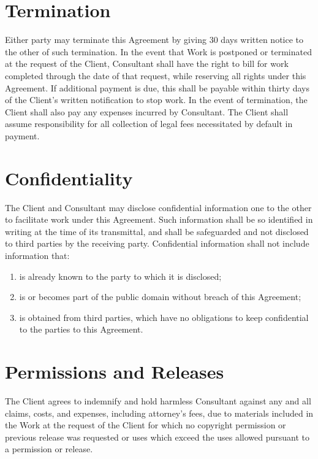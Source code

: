 \documentclass[10pt]{article}
\begin{document}
	
	\section{Termination}
	
	Either party may terminate this Agreement by giving 30 days written notice
	to the other of such termination. In the event that Work is postponed or
	terminated at the request of the Client, Consultant shall have the right to
	bill %
	for work completed through the date of that request, while
	reserving all rights under this Agreement. If additional payment is due,
	this shall be payable within thirty days of the Client's written
	notification to stop work. In the event of termination, the Client shall
	also pay any expenses incurred by Consultant.  The Client shall assume
	responsibility for all collection of legal fees necessitated by default in
	payment.
	
	
	
	
	\section{Confidentiality}
	
	The Client and Consultant may disclose confidential information one to the
	other to facilitate work under this Agreement.  Such information shall be so
	identified in writing at the time of its transmittal, and shall be
	safeguarded and not disclosed to third parties by the receiving party.
	Confidential information shall not include information that:
	
	\begin{enumerate}
		\item is already known to the party to which it is disclosed; 
		\item is or becomes part of the public domain without breach of this Agreement;
		\item is obtained from third parties, which have no obligations to keep
		confidential to the parties to this Agreement. 
	\end{enumerate}
	
	
	
	
	\section{Permissions and Releases}
	
	The Client agrees to indemnify and hold harmless Consultant against any and
	all claims, costs, and expenses, including attorney's fees, due to materials
	included in the Work at the request of the Client for which no copyright
	permission or previous release was requested or uses which exceed the uses
	allowed pursuant to a permission or release.  
	
\end{document}
